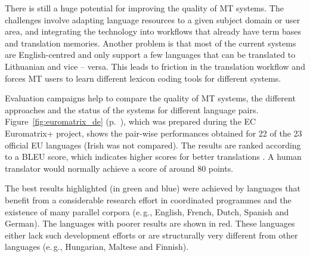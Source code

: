 \documentclass[]{../metanetpaper}
\begin{document}
\begin{multicols}{2}
There is still a huge potential for improving the quality of MT systems. The challenges involve adapting language resources to a given subject domain or user area, and integrating the technology into workflows that already have term bases and translation memories. Another problem is that most of the current systems are English-centred and only support a few languages that can be translated to Lithuanian and vice -- versa. This leads to friction in the translation workflow and forces MT users to learn different lexicon coding tools for different systems.

Evaluation campaigns help to compare the quality of MT systems, the different approaches and the status of the systems for different language pairs. Figure~\ref{fig:euromatrix_de} (p.~\pageref{fig:euromatrix_de}), which was prepared during the EC Euromatrix+ project, shows the pair-wise performances obtained for 22 of the 23 official EU languages (Irish was not compared). The results are ranked according to a BLEU score, which indicates higher scores for better translations \cite{bleu1}. A human translator would normally achieve a score of around 80 points.

The best results highlighted (in green and blue) were achieved by languages that benefit from a considerable research effort in coordinated programmes and the existence of many parallel corpora (e.\,g., English, French, Dutch, Spanish and German). The languages with poorer results are shown in red. These languages either lack such development efforts or are structurally very different from other languages (e.\,g., Hungarian, Maltese and Finnish).


\end{multicols}
\end{document}
